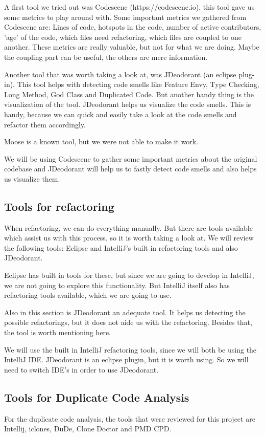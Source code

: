 \documentclass[]{article}
\begin{document}
A first tool we tried out was Codescene (https://codescene.io), this tool gave us some metrics to play around with. Some important metrics we gathered from Codescene are: Lines of code, hotspots in the code, number of active contributors, 'age' of the code, which files need refactoring, which files are coupled to one another. These metrics are really valuable, but not for what we are doing. Maybe the coupling part can be useful, the others are mere information. 

Another tool that was worth taking a look at, was JDeodorant (an eclipse plug-in). This tool helps with detecting code smells like Feature Envy, Type Checking, Long Method, God Class and Duplicated Code. But another handy thing is the visualization of the tool. JDeodorant helps us visualize the code smells. This is handy, because we can quick and easily take a look at the code smells and refactor them accordingly. 

Moose is a known tool, but we were not able to make it work. 

We will be using Codescene to gather some important metrics about the original codebase and JDeodorant will help us to fastly detect code smells and also helps us visualize them.

\subsection{Tools for refactoring}
When refactoring, we can do everything manually. But there are tools available which assist us with this process, so it is worth taking a look at. We will review the following tools: Eclipse and IntelliJ's built in refactoring tools and also JDeodorant.

Eclipse has built in tools for these, but since we are going to develop in IntelliJ, we are not going to explore this functionality. But IntelliJ itself also has refactoring tools available, which we are going to use.

Also in this section is JDeodorant an adequate tool. It helps us detecting the possible refactorings, but it does not aide us with the refactoring. Besides that, the tool is worth mentioning here.

We will use the built in IntelliJ refactoring tools, since we will both be using the IntelliJ IDE. JDeodorant is an eclipse plugin, but it is worth using. So we will need to switch IDE's in order to use JDeodorant. 

\subsection{Tools for Duplicate Code Analysis}
For the duplicate code analysis, the tools that were reviewed for this project are Intellij, iclones, DuDe, Clone Doctor and PMD CPD. 
\end{document}
